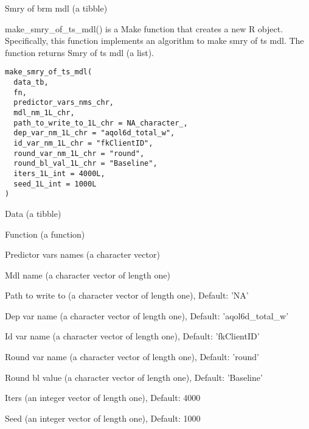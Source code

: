 \documentclass[a4paper]{book}
\begin{document}
%
\begin{Value}
Smry of brm mdl (a tibble)
\end{Value}
%
\begin{Description}\relax
make\_smry\_of\_ts\_mdl() is a Make function that creates a new R object. Specifically, this function implements an algorithm to make smry of ts mdl. The function returns Smry of ts mdl (a list).
\end{Description}
%
\begin{Usage}
\begin{verbatim}
make_smry_of_ts_mdl(
  data_tb,
  fn,
  predictor_vars_nms_chr,
  mdl_nm_1L_chr,
  path_to_write_to_1L_chr = NA_character_,
  dep_var_nm_1L_chr = "aqol6d_total_w",
  id_var_nm_1L_chr = "fkClientID",
  round_var_nm_1L_chr = "round",
  round_bl_val_1L_chr = "Baseline",
  iters_1L_int = 4000L,
  seed_1L_int = 1000L
)
\end{verbatim}
\end{Usage}
%
\begin{Arguments}
\begin{ldescription}
\item[\code{data\_tb}] Data (a tibble)

\item[\code{fn}] Function (a function)

\item[\code{predictor\_vars\_nms\_chr}] Predictor vars names (a character vector)

\item[\code{mdl\_nm\_1L\_chr}] Mdl name (a character vector of length one)

\item[\code{path\_to\_write\_to\_1L\_chr}] Path to write to (a character vector of length one), Default: 'NA'

\item[\code{dep\_var\_nm\_1L\_chr}] Dep var name (a character vector of length one), Default: 'aqol6d\_total\_w'

\item[\code{id\_var\_nm\_1L\_chr}] Id var name (a character vector of length one), Default: 'fkClientID'

\item[\code{round\_var\_nm\_1L\_chr}] Round var name (a character vector of length one), Default: 'round'

\item[\code{round\_bl\_val\_1L\_chr}] Round bl value (a character vector of length one), Default: 'Baseline'

\item[\code{iters\_1L\_int}] Iters (an integer vector of length one), Default: 4000

\item[\code{seed\_1L\_int}] Seed (an integer vector of length one), Default: 1000
\end{ldescription}
\end{Arguments}
\end{document}
